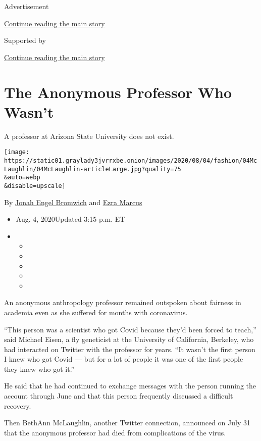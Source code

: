 Advertisement

\protect\hyperlink{after-top}{Continue reading the main story}

Supported by

\protect\hyperlink{after-sponsor}{Continue reading the main story}

\hypertarget{the-anonymous-professor-who-wasnt}{%
\section{The Anonymous Professor Who
Wasn't}\label{the-anonymous-professor-who-wasnt}}

A professor at Arizona State University does not exist.

\texttt{[image: https://static01.graylady3jvrrxbe.onion/images/2020/08/04/fashion/04McLaughlin/04McLaughlin-articleLarge.jpg?quality=75\\\&auto=webp\\\&disable=upscale]}

By
\href{https://www.nytimes3xbfgragh.onion/by/jonah-engel-bromwich}{Jonah
Engel Bromwich} and
\href{https://www.nytimes3xbfgragh.onion/by/ezra-marcus}{Ezra Marcus}

\begin{itemize}
\item
  Aug. 4, 2020Updated 3:15 p.m. ET
\item
  \begin{itemize}
  \item
  \item
  \item
  \item
  \item
  \end{itemize}
\end{itemize}

An anonymous anthropology professor remained outspoken about fairness in
academia even as she suffered for months with coronavirus.

``This person was a scientist who got Covid because they'd been forced
to teach,'' said Michael Eisen, a fly geneticist at the University of
California, Berkeley, who had interacted on Twitter with the professor
for years. ``It wasn't the first person I knew who got Covid --- but for
a lot of people it was one of the first people they knew who got it.''

He said that he had continued to exchange messages with the person
running the account through June and that this person frequently
discussed a difficult recovery.

Then BethAnn McLaughlin, another Twitter connection, announced on July
31 that the anonymous professor had died from complications of the
virus.

